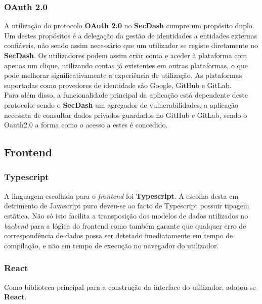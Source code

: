\subsubsection{OAuth 2.0}
A utilização do protocolo \textbf{OAuth 2.0} no \textbf{SecDash} cumpre um propósito duplo. \\

Um destes propósitos é a delegação da gestão de identidades a entidades externas confiáveis, não sendo assim necessário que um utilizador se registe diretamente no \textbf{SecDash}. Os utilizadores podem assim criar conta e aceder à plataforma com apenas um clique, utilizando contas já existentes em outras plataformas, o que pode melhorar significativamente a experiência de utilização. As plataformas suportadas como provedores de identidade são Google, GitHub e GitLab. \\

Para além disso, a funcionalidade principal da aplicação está dependente deste protocolo: sendo o \textbf{SecDash} um agregador de vulnerabilidades, a aplicação necessita de consultar dados privados guardados no GitHub e GitLab, sendo o Oauth2.0 a forma como o acesso a estes é concedido. \\

\subsection{Frontend} \label{arquitetura:tecnologias:frontend}

\subsubsection{Typescript}
A linguagem escolhida para o \textit{frontend} foi \textbf{Typescript}. A escolha desta em detrimento de Javascript puro deveu-se ao facto de Typescript possuir tipagem estática. Não só isto facilita a transposição dos modelos de dados utilizados no \textit{backend} para a lógica do frontend como também garante que qualquer erro de correspondência de dados possa ser detetado imediatamente em tempo de compilação, e não em tempo de execução no navegador do utilizador. \\

\subsubsection{React}
Como biblioteca principal para a construção da interface do utilizador, adotou-se \textbf{React}. \\

